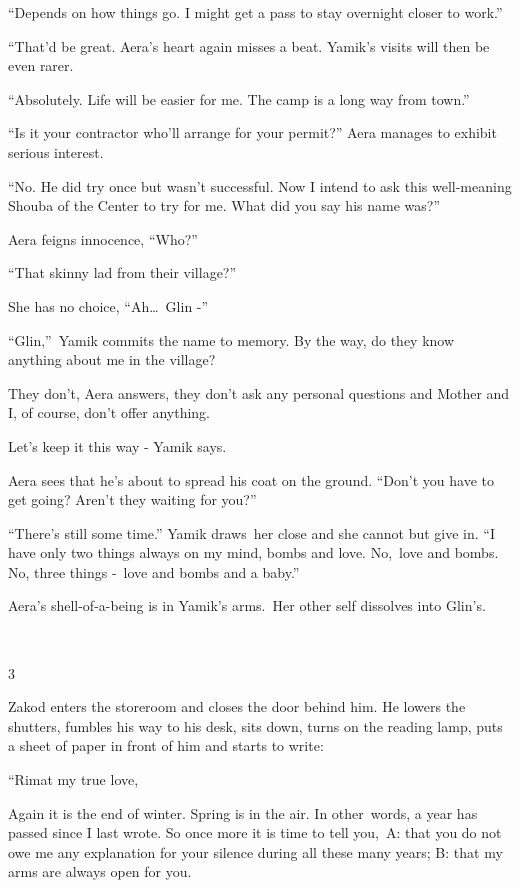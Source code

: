 \documentclass[letterpaper]{article}
\begin{document}
{}``Depends on how things go. I might get a pass to stay overnight closer to work.'' 

{}``That{}'d be great.{\textquotedbl} Aera's heart again misses a beat. Yamik's visits will then be even rarer. 

{}``Absolutely. Life will be easier for me. The camp is a long way from town.'' 

{}``Is it your contractor who'll arrange for your permit?'' Aera manages to exhibit serious interest. 

{}``No. He did try once but wasn't successful. Now I intend to ask this well-meaning Shouba of the Center to try for me.
What did you say his name was?'' 

Aera feigns innocence, ``Who?''~ 

{}``That skinny lad from their village?'' 

She has no choice, ``Ah{\dots}\ Glin -{}'' 

{}``Glin,{}''\ Yamik commits the name to memory. {\textquotedbl}By the way, do they know anything about me in the
village?{\textquotedbl}

{\textquotedbl}They don't{\textquotedbl}, Aera answers, {\textquotedbl}they don't ask any personal questions and Mother
and I, of course, don't offer anything.{\textquotedbl}

{\textquotedbl}Let's keep it this way -{\textquotedbl} Yamik says.

Aera sees that he's about to spread his coat on the ground. ``Don't you have to get going? Aren't they waiting for
you?'' 

{}``There's still some time.'' Yamik draws~her close and she cannot but give in. ``I have only two things always on my
mind, bombs and love. No,\ love and bombs. No, three things -\ love and bombs and a baby.'' 

Aera's shell-of-a-being is in Yamik's arms.\textcolor{red}{\ }Her other self dissolves into Glin's. 

~

3\ \ 

Zakod enters the storeroom and closes the door behind him. He lowers the shutters, fumbles his way to his desk, sits
down, turns on the reading lamp, puts a sheet of paper in front of him and starts to write:

{}``Rimat my true love,

Again it is the end of winter. Spring is in the air. In other\ words,  a year has passed since I last wrote. So once
more it is time to tell you,\ A: that you do not owe me any explanation for your silence during all these many years;
B: that my arms are always open for you.
\end{document}

